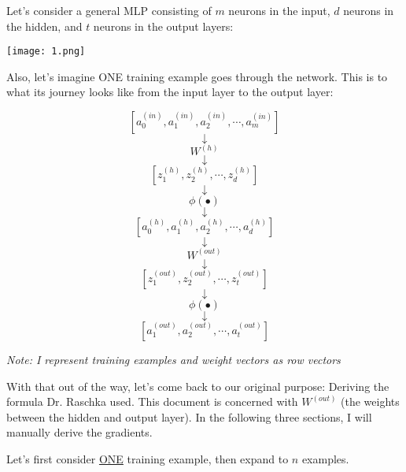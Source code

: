\documentclass[../main.tex]{subfiles}
\begin{document}
Let's consider a general MLP consisting of $m$ neurons in the input, $d$ neurons
in the hidden, and $t$ neurons in the output layers:

\begin{center}
    \texttt{[image: 1.png]}
\end{center}

Also, let's imagine ONE training example goes through the network. This is
to what its journey looks like from the input layer to the output layer:

\pagebreak
\[[a_0^{(in)}, a_1^{(in)}, a_2^{(in)}, \cdots, a_m^{(in)}]\]
\[\downarrow\]
\[W^{(h)}\]
\[\downarrow\]                  
\[[z_1^{(h)}, z_2^{(h)}, \cdots, z_d^{(h)}]\]
\[\downarrow\]
\[\phi(\bullet)\]
\[\downarrow\]
\[[a_0^{(h)}, a_1^{(h)}, a_2^{(h)}, \cdots, a_d^{(h)}]\]
\[\downarrow\]
\[W^{(out)}\]
\[\downarrow\]                  
\[[z_1^{(out)}, z_2^{(out)}, \cdots, z_t^{(out)}]\]
\[\downarrow\]
\[\phi(\bullet)\]
\[\downarrow\]
\[[a_1^{(out)}, a_2^{(out)}, \cdots, a_t^{(out)}]\]

\vspace{5mm} %

\emph{Note: I represent training examples and weight vectors as row vectors}

\vspace{5mm} %

With that out of the way, let's come back to our original purpose: Deriving the
formula Dr. Raschka used. This document is concerned with $W^{(out)}$ 
(the weights between the hidden and output layer). In the following three sections,
I will manually derive the gradients.

\vspace{5mm} %

Let's first consider \underline{ONE} training example, then expand to $n$ examples.

\end{document}
